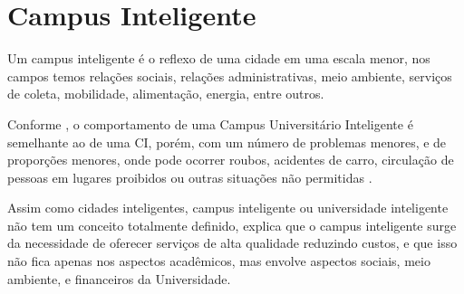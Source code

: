 




\section{Campus Inteligente}

Um campus inteligente é o reflexo de uma cidade em uma escala menor, nos campos temos relações sociais, relações administrativas, meio ambiente, serviços de coleta, mobilidade, alimentação, energia, entre outros.

Conforme , o comportamento de uma Campus Universitário Inteligente é semelhante ao de uma CI, porém, com um número de problemas menores, e de proporções menores, onde pode ocorrer roubos, acidentes de carro, circulação de pessoas em lugares proibidos ou outras situações não permitidas \cite{garay2018}.

Assim como cidades inteligentes, campus inteligente ou universidade inteligente não tem um conceito totalmente definido,  explica que o campus inteligente surge da necessidade de oferecer serviços de alta qualidade reduzindo custos, e que isso não fica apenas nos aspectos acadêmicos, mas envolve aspectos sociais, meio ambiente, e financeiros da Universidade.

